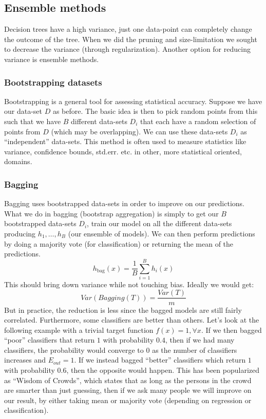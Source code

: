     \subsection{Ensemble methods}
    Decision trees have a high variance, just one data-point can completely 
    change the outcome of the tree. When we did the pruning and size-limitation 
    we sought to decrease the variance (through regularization). Another option 
    for reducing variance is ensemble methods.
    
    \subsubsection{Bootstrapping datasets}
    Bootstrapping is a general tool for assessing statistical accuracy. Suppose 
    we have our data-set $D$ as before. The basic idea is then to pick random 
    points from this such that we have $B$ different data-sets $D_i$ that each 
    have a random selection of points from $D$ (which may be overlapping). We 
    can use these data-sets $D_i$ as ``independent'' data-sets. This method is 
    often used to measure statistics like variance, confidence bounds, std.err. 
    etc. in other, more statistical oriented, domains.
    
    \subsubsection{Bagging}
    Bagging uses bootstrapped data-sets in order to improve on our predictions. 
    What we do in bagging (bootstrap aggregation) is simply to get our $B$ 
    bootstrapped data-sets $D_i$, train our model on all the different 
    data-sets producing $h_1,\dots,h_B$ (our ensemble of models). We can then 
    perform predictions by doing a majority vote (for classification) or 
    returning the mean of the predictions.
    \begin{equation*}
        h_{\text{bag}}(x)=\frac{1}{B}\sum_{i=1}^{B} h_i(x)
    \end{equation*}
    This should bring down variance while not touching bias. Ideally we would 
    get:
    \begin{equation*}
        Var(Bagging(T))=\frac{Var(T)}{m}
    \end{equation*}
    But in practice, the reduction is less since the bagged models are still 
    fairly correlated. Furthermore, some classifiers are better than others. 
    Let's look at the following example with a trivial target function $f(x)=1, 
    \forall x$. If we then bagged ``poor'' classifiers that return $1$ with 
    probability $0.4$, then if we had many classifiers, the probability would 
    converge to $0$ as the number of classifiers increases and $E_{out}=1$. If 
    we instead bagged ``better'' classifiers which return $1$ with probability 
    $0.6$, then the opposite would happen. This has been popularized as 
    ``Wisdom of Crowds'', which states that as long as the persons in the crowd 
    are smarter than just guessing, then if we ask many people we will improve 
    on our result, by either taking mean or majority vote (depending on 
    regression or classification).
    
